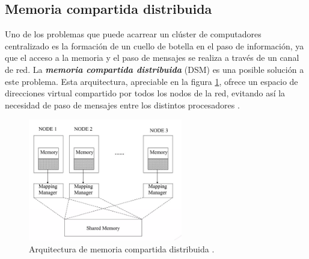 \subsection{Memoria compartida distribuida}

Uno de los problemas que puede acarrear un clúster de computadores centralizado es la formación de un cuello de 
botella en el paso de información, ya que el acceso a la memoria y el paso de mensajes se realiza a través de un canal 
de red.  La \textbf{\textit{memoria compartida distribuida}} (DSM) es una posible solución a este problema. Esta 
arquitectura, apreciable en la figura \ref{fig:dsm}, ofrece un espacio de direcciones virtual compartido por todos los 
nodos de la red, evitando así la necesidad de paso de mensajes entre los distintos procesadores \cite{nitzberg_91}.

\begin{figure}[htbp!]
    \centering
    \includegraphics[width=0.6\textwidth]{img/dsm.png}
    \caption{Arquitectura de memoria compartida distribuida \cite{dsm}.}
    \label{fig:dsm}
\end{figure}

